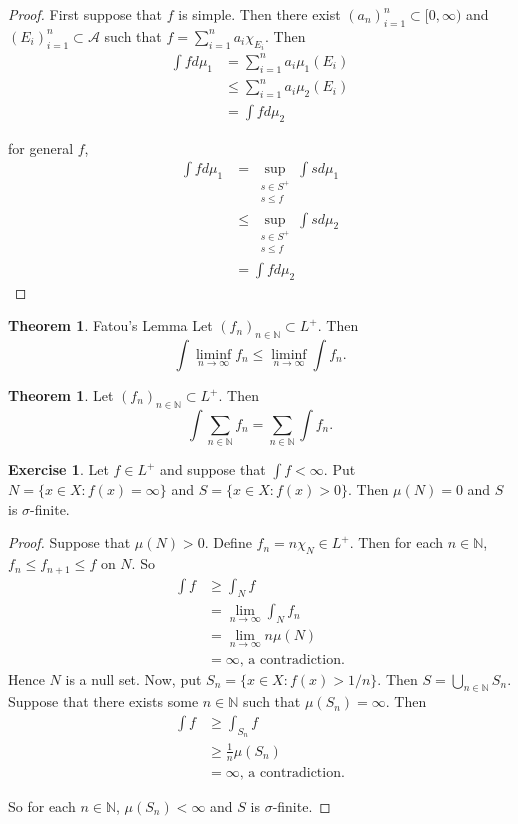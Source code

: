 \documentclass[12pt]{amsart}
\theoremstyle{definition}
\newtheorem{thm}[definition]{Theorem}
\newtheorem{ex}[definition]{Exercise}
\newcommand{\sig}{\sigma}
\newcommand{\N}{\mathbb{N}}
\newcommand{\MA}{\mathcal{A}}
\newcommand{\Rg}{[0,\infty)}
\newcommand{\limfn}{\liminf \limits_{n \rightarrow \infty}}
\newcommand{\lex}[1]{\label{ex:#1}}
\begin{document}
	\begin{proof}
		First suppose that $f$ is simple. Then there exist $(a_n)_{i=1}^n \subset \Rg$ and $(E_i)_{i=1}^n \subset \MA$ such that $f = \sum\limits_{i =1}^n a_i \chi_{E_i}$. Then 
		\begin{align*}
			\int f d\mu_1 
			&= \sum\limits_{i =1}^n a_i \mu_1(E_i)\\
			& \leq \sum\limits_{i =1}^n a_i \mu_2(E_i)\\
			&= \int f d \mu_2
		\end{align*} 
		
		for general $f$, 
		\begin{align*}
			\int f d\mu_1 
			&= \sup_{\substack{s \in S^+\\s \leq f}} \int s d \mu_1 \\
			& \leq \sup_{\substack{s \in S^+\\s \leq f}} \int s d\mu_2\\
			&= \int f d\mu_2
		\end{align*}
		
	\end{proof}
	
	\begin{thm}{Fatou's Lemma}
		Let $(f_n)_{n \in \N} \subset L^+$. Then $$\int \limfn f_n \leq \limfn \int f_n.$$
	\end{thm}
	
	\begin{thm}
		Let $(f_n)_{n \in \N} \subset L^+$. Then $$\int \sum_{n \in \N} f_n= \sum_{n \in \N} \int f_n.$$
	\end{thm}
	
	\begin{ex} \lex{00000} 
		Let $f \in L^+$ and suppose that $\int f < \infty$. Put $N = \{x \in X: f(x) = \infty\}$ and $S = \{x \in X: f(x) > 0\}$. Then $\mu(N) = 0$ and $S$ is $\sig$-finite.
	\end{ex}
	
	\begin{proof}
		Suppose that $\mu(N) > 0$. Define $f_n = n \chi_{N} \in L^+$. Then for each $n \in \N$, $f_n \leq f_{n+1} \leq f$ on $N$. So 
		\begin{align*}
			\int f 
			&\geq \int_N f\\ 
			&= \lim\limits_{n \rightarrow \infty} \int_N f_n\\ 
			&= \lim\limits_{n \rightarrow \infty} n\mu(N)\\
			&= \infty \text{, a contradiction.}
		\end{align*}
		Hence $N$ is a null set. Now, put $S_n = \{x \in X: f(x)>1/n\}$. Then $S = \bigcup \limits_{n \in \N}S_n$. Suppose that there exists some $n \in \N$ such that $\mu(S_n) = \infty$. Then 
		\begin{align*}
			\int f 
			&\geq \int_{S_n} f \\
			&\geq \frac{1}{n}\mu(S_n) \\
			&= \infty \text{, a contradiction.}
		\end{align*}
		
		So for each $n \in \N$, $\mu(S_n) < \infty$ and $S$ is $\sig$-finite.
		
	\end{proof}
	
\end{document}
